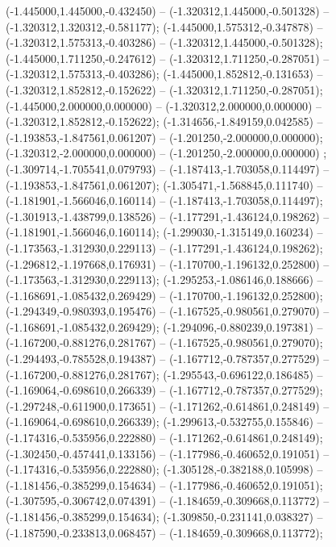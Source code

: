  (-1.445000,1.445000,-0.432450) -- (-1.320312,1.445000,-0.501328) -- (-1.320312,1.320312,-0.581177);
 (-1.445000,1.575312,-0.347878) -- (-1.320312,1.575313,-0.403286) -- (-1.320312,1.445000,-0.501328);
 (-1.445000,1.711250,-0.247612) -- (-1.320312,1.711250,-0.287051) -- (-1.320312,1.575313,-0.403286);
 (-1.445000,1.852812,-0.131653) -- (-1.320312,1.852812,-0.152622) -- (-1.320312,1.711250,-0.287051);
 (-1.445000,2.000000,0.000000) -- (-1.320312,2.000000,0.000000) -- (-1.320312,1.852812,-0.152622);
 (-1.314656,-1.849159,0.042585) -- (-1.193853,-1.847561,0.061207) -- (-1.201250,-2.000000,0.000000);
 (-1.320312,-2.000000,0.000000) -- (-1.201250,-2.000000,0.000000) ;
 (-1.309714,-1.705541,0.079793) -- (-1.187413,-1.703058,0.114497) -- (-1.193853,-1.847561,0.061207);
 (-1.305471,-1.568845,0.111740) -- (-1.181901,-1.566046,0.160114) -- (-1.187413,-1.703058,0.114497);
 (-1.301913,-1.438799,0.138526) -- (-1.177291,-1.436124,0.198262) -- (-1.181901,-1.566046,0.160114);
 (-1.299030,-1.315149,0.160234) -- (-1.173563,-1.312930,0.229113) -- (-1.177291,-1.436124,0.198262);
 (-1.296812,-1.197668,0.176931) -- (-1.170700,-1.196132,0.252800) -- (-1.173563,-1.312930,0.229113);
 (-1.295253,-1.086146,0.188666) -- (-1.168691,-1.085432,0.269429) -- (-1.170700,-1.196132,0.252800);
 (-1.294349,-0.980393,0.195476) -- (-1.167525,-0.980561,0.279070) -- (-1.168691,-1.085432,0.269429);
 (-1.294096,-0.880239,0.197381) -- (-1.167200,-0.881276,0.281767) -- (-1.167525,-0.980561,0.279070);
 (-1.294493,-0.785528,0.194387) -- (-1.167712,-0.787357,0.277529) -- (-1.167200,-0.881276,0.281767);
 (-1.295543,-0.696122,0.186485) -- (-1.169064,-0.698610,0.266339) -- (-1.167712,-0.787357,0.277529);
 (-1.297248,-0.611900,0.173651) -- (-1.171262,-0.614861,0.248149) -- (-1.169064,-0.698610,0.266339);
 (-1.299613,-0.532755,0.155846) -- (-1.174316,-0.535956,0.222880) -- (-1.171262,-0.614861,0.248149);
 (-1.302450,-0.457441,0.133156) -- (-1.177986,-0.460652,0.191051) -- (-1.174316,-0.535956,0.222880);
 (-1.305128,-0.382188,0.105998) -- (-1.181456,-0.385299,0.154634) -- (-1.177986,-0.460652,0.191051);
 (-1.307595,-0.306742,0.074391) -- (-1.184659,-0.309668,0.113772) -- (-1.181456,-0.385299,0.154634);
 (-1.309850,-0.231141,0.038327) -- (-1.187590,-0.233813,0.068457) -- (-1.184659,-0.309668,0.113772);
